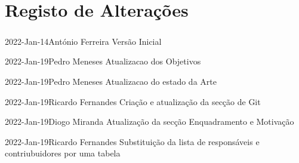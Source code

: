 \chapter*{Registo de Alterações}
\paragraph{}

\begin{logentry}{2022-Jan-14}{António Ferreira}
Versão Inicial
\end{logentry}

\begin{logentry}{2022-Jan-19}{Pedro Meneses}
Atualizacao dos Objetivos
\end{logentry}

\begin{logentry}{2022-Jan-19}{Pedro Meneses}
Atualizacao do estado da Arte
\end{logentry}

\begin{logentry}{2022-Jan-19}{Ricardo Fernandes}
Criação e atualização da secção de Git
\end{logentry}

\begin{logentry}{2022-Jan-19}{Diogo Miranda}
Atualização da secção Enquadramento e Motivação
\end{logentry}

\begin{logentry}{2022-Jan-19}{Ricardo Fernandes}
Substituição da lista de responsáveis e contriubuidores por uma tabela
\end{logentry}